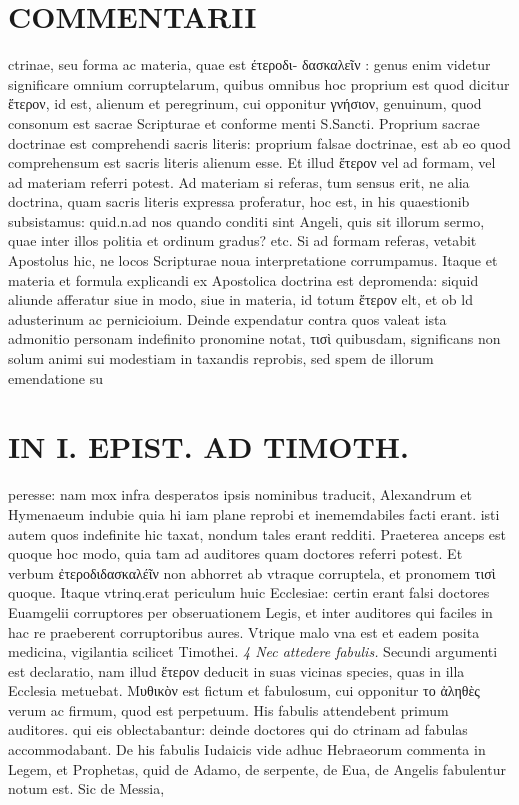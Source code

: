 \documentclass{article}
\begin{document}
\begin{pages}
\section*{COMMENTARII }
\marginpar{[ p.18 ]}\pstart ctrinae, seu forma ac materia, quae est έτεροδι- δασκαλεῖν : genus enim videtur significare omnium corruptelarum, quibus omnibus hoc proprium est quod dicitur ἕτερον, id est, alienum et peregrinum, cui opponitur γνήσιον, genuinum, quod consonum est sacrae Scripturae et conforme menti S.Sancti. Proprium sacrae doctrinae est comprehendi sacris literis: proprium falsae doctrinae, est ab eo quod comprehensum est sacris literis alienum esse. Et illud ἕτερον vel ad formam, vel ad materiam referri potest. Ad materiam si referas, tum sensus erit, ne alia doctrina, quam sacris literis expressa proferatur, hoc est, in his quaestionib subsistamus: quid.n.ad nos quando conditi sint Angeli, quis sit illorum sermo, quae inter illos politia et ordinum gradus? etc. Si ad formam referas, vetabit Apostolus hic, ne locos Scripturae noua interpretatione corrumpamus. Itaque et materia et formula explicandi ex Apostolica doctrina est depromenda: siquid aliunde afferatur siue in modo, siue in materia, id totum ἕτερον elt, et ob ld adusterinum ac pernicioium.  \pend\pstart Deinde expendatur contra quos valeat ista admonitio personam indefinito pronomine notat, τισὶ quibusdam, significans non solum animi sui modestiam in taxandis reprobis, sed spem de illorum emendatione su\pend
\section*{IN I. EPIST. AD TIMOTH. }
\marginpar{[ p.19 ]}\pstart peresse: nam mox infra desperatos ipsis nominibus traducit, Alexandrum et Hymenaeum indubie quia hi iam plane reprobi et inememdabiles facti erant. isti autem quos indefinite hic taxat, nondum tales erant redditi. Praeterea anceps est quoque hoc modo, quia tam ad auditores quam doctores referri potest. Et verbum ἐτεροδιδασκαλέῖν non abhorret ab vtraque corruptela, et pronomem τισὶ quoque. Itaque vtrinq.erat periculum huic Ecclesiae: certin erant falsi doctores Euamgelii corruptores per obseruationem Legis, et inter auditores qui faciles in hac re praeberent corruptoribus aures. Vtrique malo vna est et eadem posita medicina, vigilantia scilicet Timothei.  \pend
\textit{4 Nec attedere fabulis. }\pstart Secundi argumenti est declaratio, nam illud ἕτερον deducit in suas vicinas species, quas in illa Ecclesia metuebat. Μυθικὸν est fictum et fabulosum, cui opponitur το ἀληθὲς verum ac firmum, quod est perpetuum. His fabulis attendebent primum auditores. qui eis oblectabantur: deinde doctores qui do ctrinam ad fabulas accommodabant. De his fabulis Iudaicis vide adhuc Hebraeorum commenta in Legem, et Prophetas, quid de Adamo, de serpente, de Eua, de Angelis fabulentur notum est. Sic de Messia,  \pend

\end{pages}
\end{document}
